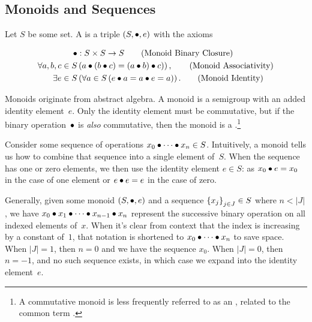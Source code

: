 \subsection{Monoids and Sequences}
\begin{definition}[Monoid]
  Let $S$ be some set.  A  is a triple $\left({S},{\bullet},{e}\right)$
    with the axioms

  \begin{align}
    \monoidop &: S\times S \rightarrow S
      \tag{Monoid Binary Closure} \\
    \Forall{a,b,c\in S&}{
      a\monoidop(b\monoidop c) = (a\monoidop b)\monoidop c)
    }, \tag{Monoid Associativity} \\
    \Exists{e\in S&}{\Forall{a\in S}{e\monoidop a = a\monoidop e = a}}.
      \tag{Monoid Identity}\label{eq:monoid-identity}
  \end{align}
\end{definition}

Monoids originate from abstract algebra.
A monoid is a semigroup with an added identity element~$e$.
Only the identity element must be commutative,
  but if the binary operation~$\bullet$ is \emph{also} commutative,
    then the monoid is a .\footnote{%
      A commutative monoid is less frequently referred to as an
        ,
          related to the common term .}

Consider some sequence of operations
  $x_0 \bullet\cdots\bullet x_n \in S$.
Intuitively,
  a monoid tells us how to combine that sequence into a single element
  of~$S$.
When the sequence has one or zero elements,
  we then use the identity element $e\in S$:
    as $x_0 \bullet e = x_0$ in the case of one element
    or $e \bullet e = e$ in the case of zero.

\indexsym{}
\begin{definition}
Generally,
  given some monoid $\left({S},{\bullet},{e}\right)$ and a sequence $\left\{x_{j}\right\}_{j\in J}\in S$
  where $n<|J|$,
    we have
    $x_0\bullet x_1\bullet\cdots\bullet x_{n-1}\bullet x_n$
    represent the successive binary operation on all indexed elements
    of~$x$.
When it's clear from context that the index is increasing by a constant
  of~$1$,
    that notation is shortened to $x_0\bullet\cdots\bullet x_n$ to save
    space.
When $|J|=1$, then $n=0$ and we have the sequence $x_0$.
When $|J|=0$, then $n=-1$,
  and no such sequence exists,
  in which case we expand into the identity element~$e$.
\end{definition}

